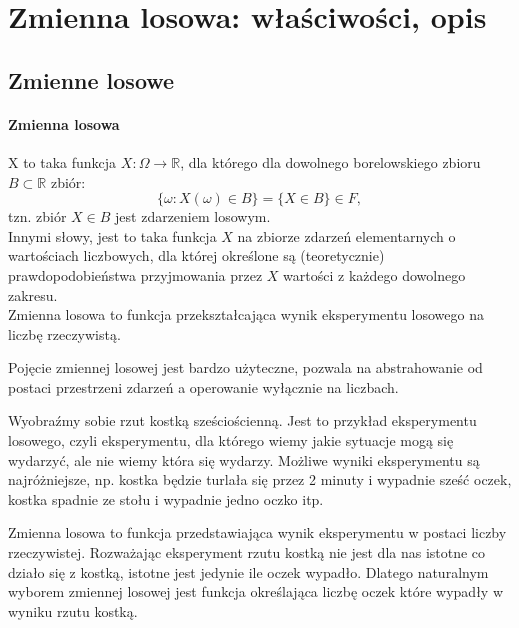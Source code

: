 \documentclass[a4paper,twoside]{report}
\begin{document}
\section{Zmienna losowa: właściwości, opis}

\subsection{Zmienne losowe}

\paragraph{Zmienna losowa} X to taka funkcja $X : \Omega \longrightarrow \mathbb{R}$, dla którego dla dowolnego borelowskiego zbioru $B \subset \mathbb{R}$ zbiór:
\[\{\omega : X(\omega) \in B \} = \{X \in B\} \in F,\]
tzn. zbiór $X \in B$ jest zdarzeniem losowym.\\

Innymi słowy, jest to taka funkcja $X$ na zbiorze zdarzeń elementarnych o wartościach liczbowych, dla której określone są (teoretycznie) prawdopodobieństwa przyjmowania przez $X$ wartości z każdego dowolnego zakresu.\\

Zmienna losowa to funkcja przekształcająca wynik eksperymentu losowego na liczbę rzeczywistą. 

Pojęcie zmiennej losowej jest bardzo użyteczne, pozwala na abstrahowanie od postaci przestrzeni zdarzeń a operowanie wyłącznie na liczbach. 

Wyobraźmy sobie rzut kostką sześciościenną. Jest to przykład eksperymentu losowego, czyli eksperymentu, dla którego wiemy jakie sytuacje mogą się wydarzyć, ale nie wiemy która się wydarzy. Możliwe wyniki eksperymentu są najróżniejsze, np. kostka będzie turlała się przez 2 minuty i wypadnie sześć oczek, kostka spadnie ze stołu i wypadnie jedno oczko itp. 

Zmienna losowa to funkcja przedstawiająca wynik eksperymentu w postaci liczby rzeczywistej. Rozważając eksperyment rzutu kostką nie jest dla nas istotne co działo się z kostką, istotne jest jedynie ile oczek wypadło. Dlatego naturalnym wyborem zmiennej losowej jest funkcja określająca liczbę oczek które wypadły w wyniku rzutu kostką.
\end{document}
